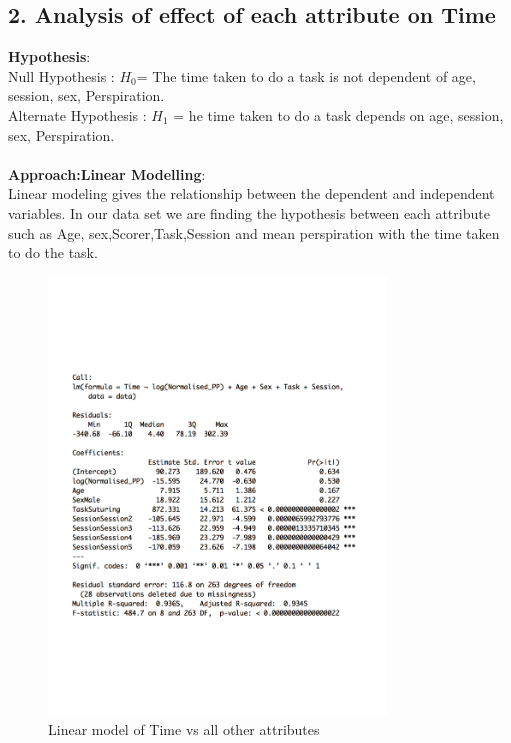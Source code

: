 \documentclass[12pt,epsf]{report}
\begin{document}
{\subsection*{2. Analysis of effect of each attribute on Time}
\textbf{Hypothesis}:\\
Null Hypothesis : $H_0 $=  The time taken to do a task is not dependent of age, session, sex, Perspiration.\\
Alternate Hypothesis : $H_1$ =  he time taken to do a task depends on  age, session, sex, Perspiration.\\
\\
\textbf{Approach:Linear Modelling}:\\
Linear modeling gives the relationship between the dependent and independent variables. 
In our data set we are finding the hypothesis between each attribute such as Age, sex,Scorer,Task,Session and mean perspiration with the time taken to do the task.\\
\begin{figure}[!htb]
	\centering
	\includegraphics[width=0.8\textwidth]{TimeSummary.pdf}
	\caption{Linear model of Time vs all other attributes}
	\centering
\end{figure}
\\
}
\end{document}
